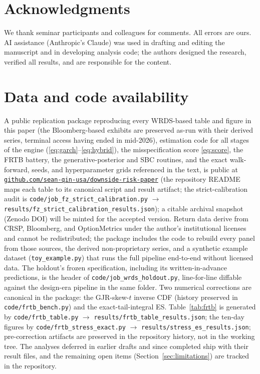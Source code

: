 \documentclass[11pt]{article}
\theoremstyle{remark}
\begin{document}
\section*{Acknowledgments}
We thank seminar participants and colleagues for comments. All errors
are ours.
AI assistance (Anthropic's Claude) was used in drafting and editing
the manuscript and in developing analysis code; the authors designed
the research, verified all results, and are responsible for the
content.

\section*{Data and code availability}
A public replication package reproducing every WRDS-based table and
figure in this paper (the Bloomberg-based exhibits are preserved
as-run with their derived series, terminal access having ended in
mid-2026), estimation code for all stages of the engine
(\eqref{eq:garch}--\eqref{eq:hybrid}), the misspecification score
\eqref{eq:score}, the FRTB battery, the generative-posterior and SBC
routines, and the exact walk-forward, seeds, and hyperparameter grids referenced in the text, is public at
\href{https://github.com/sean-qin-usa/downside-risk-paper}{\texttt{github.com/sean-qin-usa/downside-risk-paper}}
(the repository README maps each table to its canonical script and
result artifact; the strict-calibration audit is
\texttt{code/job\_fz\_strict\_calibration.py}
$\to$ \texttt{results/fz\_strict\_calibration\_results.json});
a citable archival snapshot (Zenodo DOI) will be minted for the
accepted version. Return data derive from CRSP,
Bloomberg, and OptionMetrics under the author's institutional licenses
and cannot be redistributed; the package includes the code to rebuild
every panel from those sources, the derived non-proprietary series, and
a synthetic example dataset (\texttt{toy\_example.py}) that runs the full
pipeline end-to-end without licensed data. The holdout's frozen
specification, including its written-in-advance predictions, is the
header of \texttt{code/job\_wrds\_holdout.py}, line-for-line diffable
against the design-era pipeline in the same folder. Two numerical corrections are canonical in the package:
the GJR-skew-$t$ inverse CDF (history preserved in
\texttt{code/frtb\_bench.py}) and the exact-tail-integral ES.
Table~\ref{tab:frtb} is generated by \texttt{code/frtb\_table.py}
$\to$ \texttt{results/frtb\_table\_results.json}; the ten-day
figures by \texttt{code/frtb\_stress\_exact.py} $\to$
\texttt{results/stress\_es\_results.json}; pre-correction artifacts
are preserved in the repository history, not in the working tree. The
analyses deferred in earlier drafts and since completed ship with
their result files, and the remaining open items
(Section~\ref{sec:limitations}) are tracked in the repository.
\end{document}
